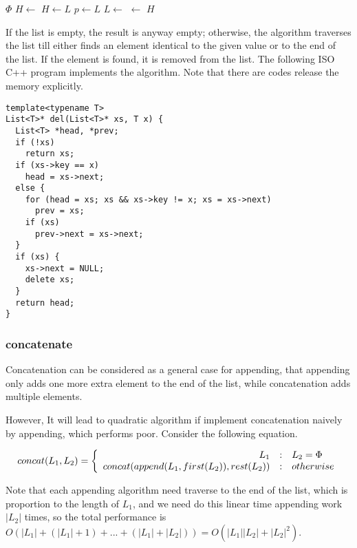\documentclass{article}
\begin{document}
\begin{algorithmic}
   
    \State \Return $\Phi$
  \EndIf
    \State $H \gets$ 
  \Else
    \State $H \gets L$
     
      \State $p \gets L$
      \State $L \gets$ 
    \EndWhile
     
      \State {} $\gets$ 
    \EndIf
  \EndIf
  \State \Return $H$
\EndFunction
\end{algorithmic}

If the list is empty, the result is anyway empty; otherwise, the algorithm traverses the list till either finds an element identical to the given value or to the
end of the list. If the element is found, it is removed from the list. The following ISO C++ program implements the algorithm. Note that there are codes release the memory explicitly.

\lstset{language=C++}
\begin{lstlisting}
template<typename T>
List<T>* del(List<T>* xs, T x) {
  List<T> *head, *prev;
  if (!xs)
    return xs;
  if (xs->key == x)
    head = xs->next;
  else {
    for (head = xs; xs && xs->key != x; xs = xs->next)
      prev = xs;
    if (xs)
      prev->next = xs->next;
  }
  if (xs) {
    xs->next = NULL;
    delete xs;
  }
  return head;
}
\end{lstlisting}

\subsubsection{concatenate}
\label{concat}
Concatenation can be considered as a general case for appending, that appending only adds one more extra element to the end of the list, while concatenation adds multiple elements.

However, It will lead to quadratic algorithm if implement concatenation naively by appending, which performs poor. Consider the
following equation.

\[
concat(L_1, L_2) = \left \{
  \begin{array}
  {r@{\quad:\quad}l}
  L_1 & L_2 = \Phi \\
  concat(append(L_1, first(L_2)), rest(L_2)) & otherwise
  \end{array}
\right.
\]

Note that each appending algorithm need traverse to the end of the list, which is proportion to the length of $L_1$, and
we need do this linear time appending work $|L_2|$ times, so the total performance is $O(|L_1| + (|L_1| + 1) + ... + (|L_1| + |L_2|)) = O(|L_1||L_2| + |L_2|^2)$.
\end{document}
